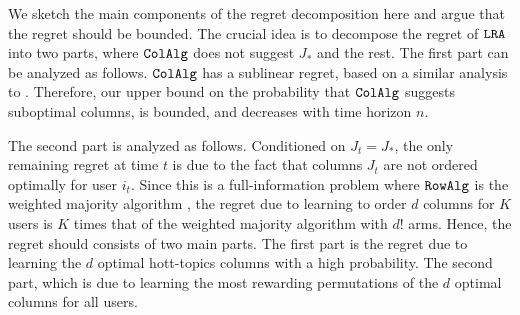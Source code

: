
%
%
We sketch the main components of the regret decomposition here and argue that the regret should be bounded. The crucial idea is to decompose the regret of ${\tt LRA}$ into two parts, where ${\tt ColAlg}$ does not suggest $J_\ast$ and the rest. The first part can be analyzed as follows. ${\tt ColAlg}$ has a sublinear regret, based on a similar analysis to \citet{radlinski2008learning}. Therefore, our upper bound on the probability that ${\tt ColAlg}$ suggests suboptimal columns, is bounded, and decreases with time horizon $n$.

The second part is analyzed as follows. Conditioned on $J_t = J_\ast$, the only remaining regret at time $t$ is due to the fact that columns $J_t$ are not ordered optimally for user $i_t$. Since this is a full-information problem where ${\tt RowAlg}$ is the weighted majority algorithm \citep{littlestone1994weighted}, the regret due to learning to order $d$ columns for $K$ users is $K$ times that of the weighted majority algorithm with $d!$ arms.
Hence, the regret should consists of two main parts. The first part is the regret due to learning the $d$ optimal hott-topics columns with a high probability. The second part, which is due to learning the most rewarding permutations of the $d$ optimal columns for all users.


